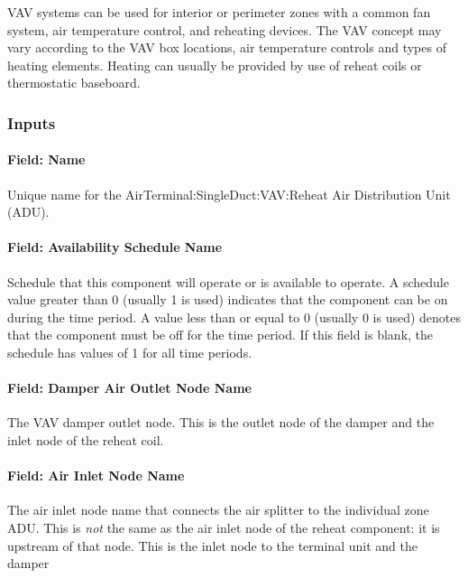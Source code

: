 VAV systems can be used for interior or perimeter zones with a common fan system, air temperature control, and reheating devices. The VAV concept may vary according to the VAV box locations, air temperature controls and types of heating elements. Heating can usually be provided by use of reheat coils or thermostatic baseboard.

\subsubsection{Inputs}\label{inputs-2-001}

\paragraph{Field: Name}\label{field-name-2-000}

Unique name for the AirTerminal:SingleDuct:VAV:Reheat Air Distribution Unit (ADU).

\paragraph{Field: Availability Schedule Name}\label{field-availability-schedule-name-2}

Schedule that this component will operate or is available to operate. A schedule value greater than 0 (usually 1 is used) indicates that the component can be on during the time period. A value less than or equal to 0 (usually 0 is used) denotes that the component must be off for the time period. If this field is blank, the schedule has values of 1 for all time periods.

\paragraph{Field: Damper Air Outlet Node Name}\label{field-damper-air-outlet-node-name}

The VAV damper outlet node. This is the outlet node of the damper and the inlet node of the reheat coil.

\paragraph{Field: Air Inlet Node Name}\label{field-air-inlet-node-name-1}

The air inlet node name that connects the air splitter to the individual zone ADU. This is \emph{not} the same as the air inlet node of the reheat component: it is upstream of that node. This is the inlet node to the terminal unit and the damper

